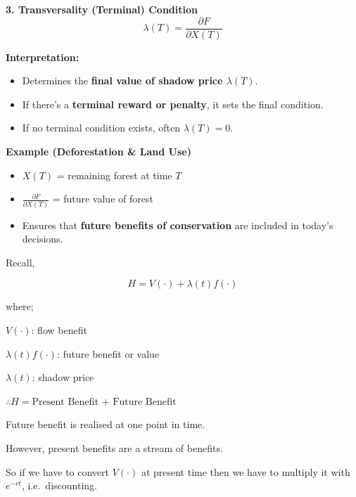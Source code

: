 \documentclass[
  ignorenonframetext,
]{beamer}
\providecommand{\tightlist}{%
  \setlength{\itemsep}{0pt}\setlength{\parskip}{0pt}}\usepackage{longtable,booktabs,array}
\begin{document}
\begin{frame}
\begin{block}{\textbf{3. Transversality (Terminal) Condition}}
\label{transversality-terminal-condition}
\[\lambda(T)=\frac{\partial F}{\partial X(T)}\]

\begin{block}{\textbf{Interpretation:}}
\label{interpretation-2}
\begin{itemize}
\tightlist
\item
  Determines the \textbf{final value of shadow price \(\lambda(T)\)}.\\
\item
  If there's a \textbf{terminal reward or penalty}, it sets the final
  condition.\\
\item
  If no terminal condition exists, often \textbf{\(\lambda(T)=0\)}.
\end{itemize}
\end{block}

\begin{block}{\textbf{Example (Deforestation \& Land Use)}}
\label{example-deforestation-land-use}
\begin{itemize}
\tightlist
\item
  \(X(T)\) = remaining forest at time \(T\)
\item
  \(\frac{\partial F}{\partial X(T)}\) = future value of forest\\
\item
  Ensures that \textbf{future benefits of conservation} are included in
  today's decisions.
\end{itemize}
\end{block}
\end{block}
\end{frame}

\begin{frame}
Recall,

\[
H = V(\cdot) + \lambda (t)f(\cdot)
\]

where;

\(V(\cdot)\): flow benefit

\(\lambda (t)f(\cdot)\): future benefit or value

\(\lambda (t)\): shadow price
\end{frame}

\begin{frame}
\(\therefore H = \text{Present Benefit + Future Benefit}\)

Future benefit is realised at one point in time.

However, present benefits are a stream of benefits.

So if we have to convert \(V(\cdot)\) at present time then we have to
multiply it with \(e^{-rt}\), i.e.~discounting.
\end{frame}
\end{document}
